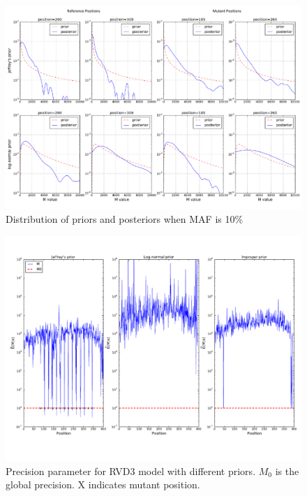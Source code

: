 \documentclass[11pt,reqno]{amsart}
\begin{document}
\begin{figure}[!tbp]
\begin{center}
\includegraphics[width=170mm]{figs/post_prior_10.pdf}
\caption{Distribution of priors and posteriors when MAF is 10\%}
\label{fig:dilu_10}
\end{center}
\end{figure}

\begin{figure}[htbp]
\begin{center}
\includegraphics[width=140mm]{figs/priors_compare.pdf}
\caption{Precision parameter for RVD3 model with different priors. $M_0$ is the global precision. X indicates mutant position.}
\label{fig:priors_compare}
\end{center}
\end{figure}
\end{document}
